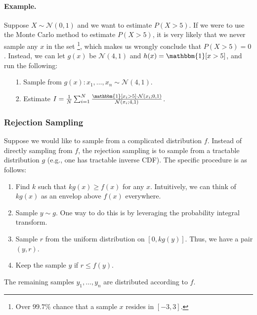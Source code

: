         \paragraph{Example.}
        Suppose $X \sim \mathcal{N}(0, 1)$ and we want to estimate $P(X > 5)$.
        If we were to use the Monte Carlo method to estimate $P(X>5)$, it is very likely that we never sample any $x$ in the set \footnote{Over $99.7\%$ chance that a sample $x$ resides in $[-3, 3]$.}, which makes us wrongly conclude that $P(X > 5) = 0$.
        Instead, we can let $g(x)$ be $\mathcal{N}(4, 1)$ and $h(x) = \mathbbm{1}[x > 5]$, and run the following:
            \begin{itemize}
                \item[1.] Sample from $g(x): x_1, \ldots, x_n \sim \mathcal{N}(4, 1) $.
                \item[2.] Estimate $I = \frac{1}{\ndata} \sum_{i=1}^{\ndata}{\frac{\mathbbm{1}[x_i > 5] \cdot \mathcal{N}(x_i; 0, 1)}{\mathcal{N}(x_i; 4, 1)}}$.
            \end{itemize}

    \subsubsection{Rejection Sampling}
        Suppose we would like to sample from a complicated distribution $f$.
        Instead of directly sampling from $f$, the rejection sampling is to sample from a tractable distribution $g$ (e.g., one has tractable inverse CDF).
        The specific procedure is as follows:
        \begin{enumerate}
            \item Find $k$ such that $k g(x) \ge f(x)$ for any $x$. Intuitively, we can think of $k g(x)$ as an envelop above $f(x)$ everywhere.
            \item Sample $y \sim g$. One way to do this is by leveraging the probability integral transform.
            \item Sample $r$ from the uniform distribution on $[0, kg(y)]$. Thus, we have a pair $(y, r)$.
            \item Keep the sample $y$ if $r \le f(y)$.
        \end{enumerate}
        The remaining samples $y_1, \ldots, y_n$ are distributed according to $f$.

